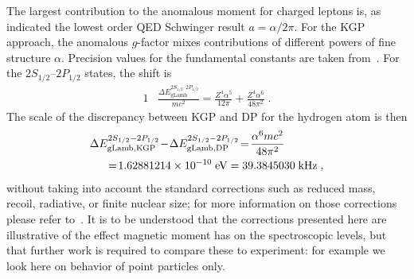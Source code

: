 \documentclass[epj]{svjour}
\begin{document}
The largest contribution to the anomalous moment for charged leptons is, as indicated the lowest order QED Schwinger result $a=\alpha/2\pi $. For the KGP approach, the anomalous $g$-factor mixes contributions of different powers of fine structure $\alpha$. Precision values for the fundamental constants are taken from~\cite{Mohr:2012tt}. For the $2S_{1/2}–2P_{1/2}$ states, the shift is
\begin{alignat}{1}
\label{lamb04} &\frac{\Delta E_{\mathrm{gLamb}}^{2S_{1/2}–2P_{1/2}}}{mc^{2}}=\frac{Z^{4}\alpha^{5}}{12\pi}+\frac{Z^{4}\alpha^{6}}{48\pi^{2}}\;.
\end{alignat}
The scale of the discrepancy between KGP and DP for the hydrogen atom is then
\begin{alignat}{1}
\label{lamb05} \Delta &E_{\mathrm{gLamb,KGP}}^{2S_{1/2}-2P_{1/2}}\!-\!\Delta E_{\mathrm{gLamb,DP}}^{2S_{1/2}-2P_{1/2}}\!=\!\frac{\alpha^{6}mc^{2}}{48\pi^{2}}\\ \notag&\;\;=\!1.62881214\times10^{-10}\;\mathrm{eV} =39.3845030\;\mathrm{kHz}\;,\end{alignat}
without taking into account the standard corrections such as reduced mass, recoil, radiative, or finite nuclear size; for more information on those corrections please refer to~\cite{sy90,Jentschura:1996zz,Eides:2000xc,Mohr:2012tt}. It is to be understood that the corrections presented here are illustrative of the effect magnetic moment has on the spectroscopic levels, but that further work is required to compare these to experiment: for example we look here on behavior of point particles only.
\end{document}

